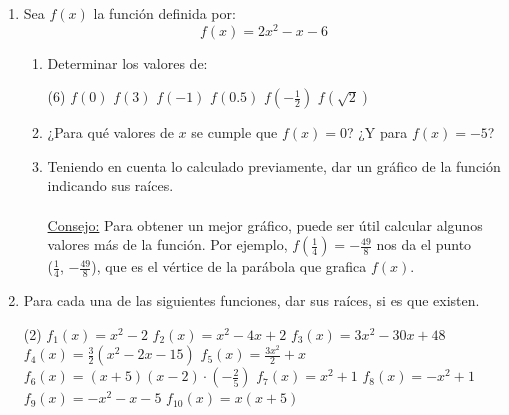 \documentclass{article}
\begin{document}
\begin{enumerate}[label=\textsc{\roman*}.]
    \item {Sea $f(x)$ la función definida por:
        \begin{equation*}
            f(x) = 2x^2 - x - 6
        \end{equation*}
        \begin{enumerate}[label=\arabic*.]
        \item { Determinar los valores de:
            \begin{tasks}[style=enumerate, after-item-skip=4mm, label = \alph*)](6)
                \task $f(0)$                    %
                \task $f(3)$                    %
                \task $f(-1)$                   %
                \task $f(0.5)$                  %
                \task $f(-\frac{1}{2})$         %
                \task $f(\sqrt 2)$              %
            \end{tasks}
            }
        \item ¿Para qué valores de $x$ se cumple que $f(x) = 0$? ¿Y para $f(x) = -5$?
        
        \item Teniendo en cuenta lo calculado previamente, dar un gráfico de la función indicando sus raíces.
        \\\\ \ul{Consejo:} Para obtener un mejor gráfico, puede ser útil calcular algunos valores más de la función. Por ejemplo, $f(\frac{1}{4}) = -\frac{49}{8}$ nos da el punto \\($\frac{1}{4}$, $-\frac{49}{8}$), que es el vértice de la parábola que grafica $f(x)$.
        \end{enumerate}
        
    }
    
    \newpage
    \item Para cada una de las siguientes funciones, dar sus raíces, si es que existen.
        \begin{tasks}[style=enumerate, after-item-skip=4mm, label = {\alph*)}](2)
            \task $f_1(x) = x^2 - 2$                                %
            \task $f_2(x) = x^2 - 4x + 2$                           %
            \task $f_3(x) = 3 x^2 - 30 x + 48$                      %
            \task $f_4(x) = \frac{3}{2} (x^2 - 2 x - 15)$           %
            \task $f_5(x) = \frac{3 x^2}{2} + x$                    %
            \task $f_6(x) = (x+5)(x-2) \cdot (-\frac{2}{5})$        %
            \task $f_7(x) = x^2 + 1$                                %
            \task $f_8(x) = -x^2 + 1$                               %
            \task $f_9(x) = -x^2 - x - 5$                           %
            \task $f_{10}(x) = x(x+5)$                              %
        \end{tasks}
    

\end{enumerate}
\end{document}
